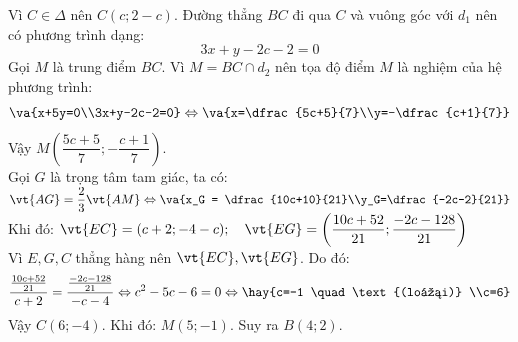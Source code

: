 Vì $C \in \Delta$ nên $C(c;2-c)$.
Đường thẳng $BC$ đi qua $C$ và vuông góc với $d_1$ nên có phương trình dạng:
$$3x+y-2c-2=0$$
Gọi $M$ là trung điểm $BC$. Vì $M = BC \cap d_2$ nên tọa độ điểm $M$ là nghiệm của hệ phương trình:
$$\va{x+5y=0\\3x+y-2c-2=0} \Leftrightarrow \va{x=\dfrac{5c+5}{7}\\y=-\dfrac{c+1}{7}}$$
Vậy $M\left(\dfrac{5c+5}{7};-\dfrac{c+1}{7}\right)$.\\
Gọi $G$ là trọng tâm tam giác, ta có:
$\vt{AG}=\dfrac{2}{3}\vt{AM} \Leftrightarrow \va{x_G = \dfrac{10c+10}{21}\\y_G=\dfrac{-2c-2}{21}}$\\
Khi đó:
$\vt{EC} = (c+2;-4-c);\quad \vt{EG} = \left(\dfrac{10c+52}{21};\dfrac{-2c-128}{21}\right)$\\
Vì $E,G,C$ thẳng hàng nên $\vt{EC},\vt{EG}$. Do đó:
$$\dfrac{\frac{10c+52}{21}}{c+2}=\dfrac{\frac{-2c-128}{21}}{-c-4} \Leftrightarrow c^2-5c-6=0 \Leftrightarrow \hay{c=-1 \quad \text{(loại)} \\c=6} $$
Vậy $C(6;-4)$.
Khi đó: $M(5;-1)$. Suy ra $B(4;2)$.

